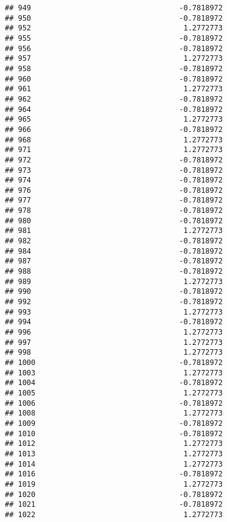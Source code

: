 \documentclass[
]{article}
\begin{document}
\begin{verbatim}
## 949                                  -0.7818972
## 950                                  -0.7818972
## 952                                   1.2772773
## 955                                  -0.7818972
## 956                                  -0.7818972
## 957                                   1.2772773
## 958                                  -0.7818972
## 960                                  -0.7818972
## 961                                   1.2772773
## 962                                  -0.7818972
## 964                                  -0.7818972
## 965                                   1.2772773
## 966                                  -0.7818972
## 968                                   1.2772773
## 971                                   1.2772773
## 972                                  -0.7818972
## 973                                  -0.7818972
## 974                                  -0.7818972
## 976                                  -0.7818972
## 977                                  -0.7818972
## 978                                  -0.7818972
## 980                                  -0.7818972
## 981                                   1.2772773
## 982                                  -0.7818972
## 984                                  -0.7818972
## 987                                  -0.7818972
## 988                                  -0.7818972
## 989                                   1.2772773
## 990                                  -0.7818972
## 992                                  -0.7818972
## 993                                   1.2772773
## 994                                  -0.7818972
## 996                                   1.2772773
## 997                                   1.2772773
## 998                                   1.2772773
## 1000                                 -0.7818972
## 1003                                  1.2772773
## 1004                                 -0.7818972
## 1005                                  1.2772773
## 1006                                 -0.7818972
## 1008                                  1.2772773
## 1009                                 -0.7818972
## 1010                                 -0.7818972
## 1012                                  1.2772773
## 1013                                  1.2772773
## 1014                                  1.2772773
## 1016                                 -0.7818972
## 1019                                  1.2772773
## 1020                                 -0.7818972
## 1021                                 -0.7818972
## 1022                                  1.2772773

\end{verbatim}
\end{document}
